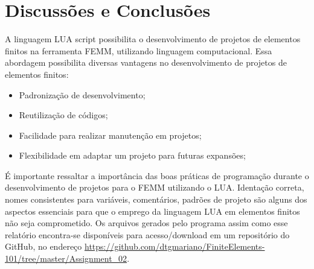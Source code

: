 \section{Discussões e Conclusões}
A linguagem LUA script possibilita o desenvolvimento de projetos de elementos finitos na ferramenta FEMM, utilizando linguagem computacional. Essa abordagem possibilita diversas vantagens no desenvolvimento de projetos de elementos finitos:
\begin{itemize}
  \item Padronização de desenvolvimento;
  \item Reutilização de códigos;
  \item Facilidade para realizar manutenção em projetos;
  \item Flexibilidade em adaptar um projeto para futuras expansões;
\end{itemize}
É importante ressaltar a importância das boas práticas de programação durante o desenvolvimento de projetos para o FEMM utilizando o LUA. Identação correta, nomes consistentes para variáveis, comentários, padrões de projeto são alguns dos aspectos essenciais para que o emprego da linguagem LUA em elementos finitos não seja comprometido. Os arquivos gerados pelo programa assim como esse relatório encontra-se disponíveis para acesso/download em um repositório do GitHub, no endereço \url{https://github.com/dtgmariano/FiniteElements-101/tree/master/Assignment_02}.

